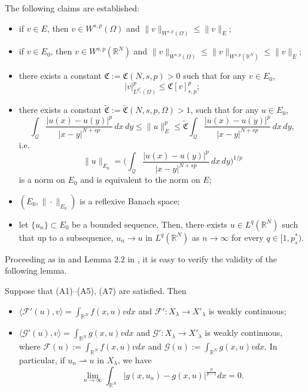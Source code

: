 \documentclass[reqno]{amsart}
\begin{document}
\begin{lemma} \label{L2.2}
The following claims are established:
\begin{itemize}
\item[(i)] if $v\in E$, then $v\in W^{s,p}(\Omega)$ and $\|v\|_{W^{s,p}(\Omega)}
\leq \|v\|_E$;

\item[(ii)] if $v\in E_0$, then $v\in W^{s,p}(\mathbb{R}^N)$ and 
$\|v\|_{W^{s,p}(\Omega)}\leq \|v\|_{W^{s,p}(\mathbb{R}^N)}\leq\|v\|_E$;

\item[(iii)] there exists a constant $\mathfrak{C}:=\mathfrak{C}(N, s, p)>0$ such that 
for any $v\in E_0$,
$$
|v|_{L^{p^*_s}(\Omega)}^p\leq\mathfrak{C}[v]_{s,p}^p;
$$
\item[(iv)] there exists a constant $\widetilde{\mathfrak{C}}
:=\widetilde{\mathfrak{C}}(N, s, p, \Omega)>1$, such that for any $u\in E_0$,
$$
\int_\mathcal{Q}\frac{|u(x)-u(y)|^p}{|x-y|^{N+sp}}\,dx\,dy
\leq\|u\|_E^p\leq\widetilde{\mathfrak{C}}\int_\mathcal{Q}
\frac{|u(x)-u(y)|^p}{|x-y|^{N+sp}}\,dx\,dy,
$$
i.e.
$$
\|u\|_{E_0}=\Big(\int_\mathcal{Q}\frac{|u(x)-u(y)|^p}{|x-y|^{N+sp}}\,dx\,dy
\Big)^{1/p}$$
is a norm on $E_0$ and is equivalent to the norm on $E$;

\item[(v)] $(E_0, \|\cdot\|_{E_0})$ is a reflexive Banach space;

\item[(vi)] let $\{u_n\}\subset E_0$ be a bounded sequence. 
Then, there exists $u\in L^q(\mathbb{R}^N)$ such that up to a
subsequence, $u_n\to  u$ in $L^q(\mathbb{R}^N)$ as $n\to \infty$ for every 
$q\in[1, p^*_s)$.
\end{itemize}
\end{lemma}

Proceeding as in \cite[Lemma 1]{r30} and Lemma $2.2$ in  \cite{r34}, it is easy to 
verify the validity of the following lemma.

\begin{lemma}\label{L2.3} 
Suppose that {\rm (A1)--(A5), (A7)} are satisfied. Then
\begin{itemize}
\item[(i)] $\langle\mathcal{F}'(u), v\rangle=\int_{\mathbb{R}^N}f(x,u)v dx$ 
and $\mathcal{F}': X_\lambda \to  X'_\lambda$ is weakly continuous;

\item[(ii)] $\langle\mathcal{G}'(u), v\rangle=\int_{\mathbb{R}^N}g(x,u)v dx$ and 
$\mathcal{G}': X_\lambda \to  X'_\lambda$ is weakly continuous, where 
$\mathcal{F}(u):=\int_{\mathbb{R}^N}f(x,u)v dx$ and 
$\mathcal{G}(u):=\int_{\mathbb{R}^N}g(x,u)v dx$. 
In particular, if $u_n\rightharpoonup u$ in $X_\lambda$, we have
$$
\lim_{n\to \infty}\int_{\mathbb{R}^N} |g(x,u_n)-g(x,u)|^{\frac{p}{p-1}}dx=0.
$$
\end{itemize}
\end{lemma}
\end{document}
